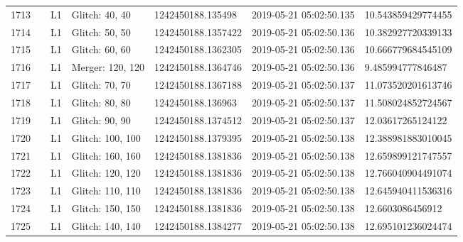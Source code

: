 \begin{longtable}{lllllll}
1713 &                                                    &       L1 &    Glitch: 40, 40 &   1242450188.135498 &  2019-05-21 05:02:50.135 &  10.543859429774455 \\
1714 &                                                    &       L1 &    Glitch: 50, 50 &  1242450188.1357422 &  2019-05-21 05:02:50.136 &  10.382927720339133 \\
1715 &                                                    &       L1 &    Glitch: 60, 60 &  1242450188.1362305 &  2019-05-21 05:02:50.136 &  10.666779684545109 \\
1716 &                                                    &       L1 &  Merger: 120, 120 &  1242450188.1364746 &  2019-05-21 05:02:50.136 &   9.485994777846487 \\
1717 &                                                    &       L1 &    Glitch: 70, 70 &  1242450188.1367188 &  2019-05-21 05:02:50.137 &  11.073520201613746 \\
1718 &                                                    &       L1 &    Glitch: 80, 80 &   1242450188.136963 &  2019-05-21 05:02:50.137 &  11.508024852724567 \\
1719 &                                                    &       L1 &    Glitch: 90, 90 &  1242450188.1374512 &  2019-05-21 05:02:50.137 &   12.03617265124122 \\
1720 &                                                    &       L1 &  Glitch: 100, 100 &  1242450188.1379395 &  2019-05-21 05:02:50.138 &  12.388981883010045 \\
1721 &                                                    &       L1 &  Glitch: 160, 160 &  1242450188.1381836 &  2019-05-21 05:02:50.138 &  12.659899121747557 \\
1722 &                                                    &       L1 &  Glitch: 120, 120 &  1242450188.1381836 &  2019-05-21 05:02:50.138 &  12.766040904491074 \\
1723 &                                                    &       L1 &  Glitch: 110, 110 &  1242450188.1381836 &  2019-05-21 05:02:50.138 &  12.645940411536316 \\
1724 &                                                    &       L1 &  Glitch: 150, 150 &  1242450188.1381836 &  2019-05-21 05:02:50.138 &    12.6603086456912 \\
1725 &                                                    &       L1 &  Glitch: 140, 140 &  1242450188.1384277 &  2019-05-21 05:02:50.138 &  12.695101236024474 \\

\end{longtable}
